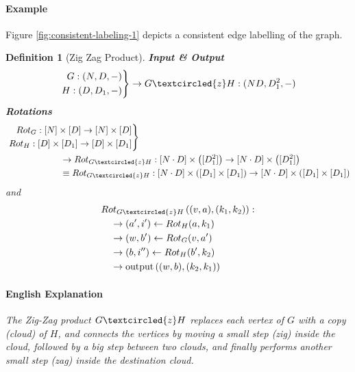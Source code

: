 \documentclass[11pt, letter]{book}
\newtheorem{definition}{Definition}[chapter]
\begin{document}
\paragraph{Example} Figure \ref{fig:consistent-labeling-1} depicts a consistent edge labelling of the graph. 

\begin{definition}[Zig Zag Product]
	\textbf{Input \& Output}
	\begin{equation}
		\left. \begin{aligned}
 			G: (N, D, -) \\
 			H: (D, D_1, -) 
 		\end{aligned}\right\rbrace \rightarrow G \textcircled{z} H : (ND, D_1^2, -)
	\end{equation}
	\textbf{Rotations}
	\begin{align}
		&\left. \begin{aligned}
 			Rot_G: [N] \times [D] \rightarrow [N] \times [D] \\
 			Rot_H: [D] \times [D_1] \rightarrow [D] \times [D_1]
 		\end{aligned}\right \rbrace 
 		\\
 		&\quad \quad \quad \quad \quad \quad
 		\rightarrow Rot_{G\textcircled{z} H}: [N\cdot D] \times \left( [D_1^2] \right) \rightarrow [N\cdot D] \times \left( [D_1^2] \right)
 		\\
 		&\quad \quad \quad \quad \quad \quad
 		\equiv Rot_{G\textcircled{z} H}: [N\cdot D] \times \left( [D_1] \times [D_1] \right) \rightarrow [N\cdot D] \times \left( [D_1] \times [D_1] \right)
	\end{align}
	and 
	\begin{align}
		&Rot_{G \textcircled {z}  H} \left ( (v, a) , (k_1, k_2) \right) : \\
		&\quad \rightarrow (a', i') \gets Rot_H(a, k_1) \\
		&\quad \rightarrow (w, b') \gets Rot_G (v, a') \\
		&\quad \rightarrow (b, i'') \gets Rot_H (b', k_2) \\
		&\quad \rightarrow \text{output} \left( (w, b), (k_2, k_1) \right)
	\end{align}
	\paragraph{English Explanation} The Zig-Zag product $G \textcircled{z} H$ replaces each vertex of $G$ with a copy (cloud) of $H$, and connects the vertices by moving a small step (zig) inside the cloud, followed by a big step between two clouds, and finally performs another small step (zag) inside the destination cloud. 
\end{definition}
\end{document}
